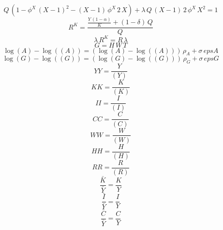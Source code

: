 \begin{dmath}
{Q}\, \left(1-{{\phi^X}}\, \left({X}-1\right)^{2}-\left({X}-1\right)\, {{\phi^X}}\, 2\, {X}\right)+{\lambda}\, {Q}\, \left({X}-1\right)\, 2\, {{\phi^X}}\, {X}^{2}=1
\end{dmath}
\begin{dmath}
{R^{K}}=\frac{\frac{{Y}\, \left(1-{{\alpha}}\right)}{{K}}+\left(1-{{\delta}}\right)\, {Q}}{{Q}}
\end{dmath}
\begin{dmath}
{\lambda}\, {R^{K}}={R}\, {\lambda}
\end{dmath}
\begin{dmath}
{G}={H}\, {W}\, {T}
\end{dmath}
\begin{dmath}
\log\left({A}\right)-\log\left(({A})\right)=\left(\log\left({A}\right)-\log\left(({A})\right)\right)\, {{\rho_{A}}}+{{\sigma}}\, {epsA}
\end{dmath}
\begin{dmath}
\log\left({G}\right)-\log\left(({G})\right)=\left(\log\left({G}\right)-\log\left(({G})\right)\right)\, {{\rho_{G}}}+{{\sigma}}\, {epsG}
\end{dmath}
\begin{dmath}
{YY}=\frac{{Y}}{({Y})}
\end{dmath}
\begin{dmath}
{KK}=\frac{{K}}{({K})}
\end{dmath}
\begin{dmath}
{II}=\frac{{I}}{({I})}
\end{dmath}
\begin{dmath}
{CC}=\frac{{C}}{({C})}
\end{dmath}
\begin{dmath}
{WW}=\frac{{W}}{({W})}
\end{dmath}
\begin{dmath}
{HH}=\frac{{H}}{({H})}
\end{dmath}
\begin{dmath}
{RR}=\frac{{R}}{({R})}
\end{dmath}
\begin{dmath}
{\frac{\bar{K}}{\bar{Y}}}=\frac{{K}}{{Y}}
\end{dmath}
\begin{dmath}
{\frac{\bar{I}}{\bar{Y}}}=\frac{{I}}{{Y}}
\end{dmath}
\begin{dmath}
{\frac{\bar{C}}{\bar{Y}}}=\frac{{C}}{{Y}}
\end{dmath}
